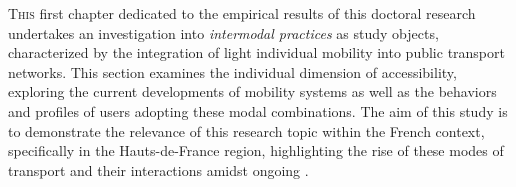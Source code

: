 \begin{refsegment}
\lettrine[lines=3, findent=8pt, nindent=0pt]{ T}{his} first chapter dedicated to the empirical results of this doctoral research undertakes an investigation into \textsl{intermodal practices} as study objects, characterized by the integration of light individual mobility into public transport networks. This section examines the individual dimension of \gls{accessibility}, exploring the current developments of mobility systems as well as the behaviors and profiles of users adopting these modal combinations. The aim of this study is to demonstrate the relevance of this research topic within the French context, specifically in the Hauts-de-France region, highlighting the rise of these modes of transport and their interactions \textcolor{blue}{\autocites[77]{oostendorp_combining_2018}[56]{ensor_mode_2021}} amidst ongoing  \textcolor{blue}{\autocite[15]{amar_homo_2016}}.%


\end{refsegment}
